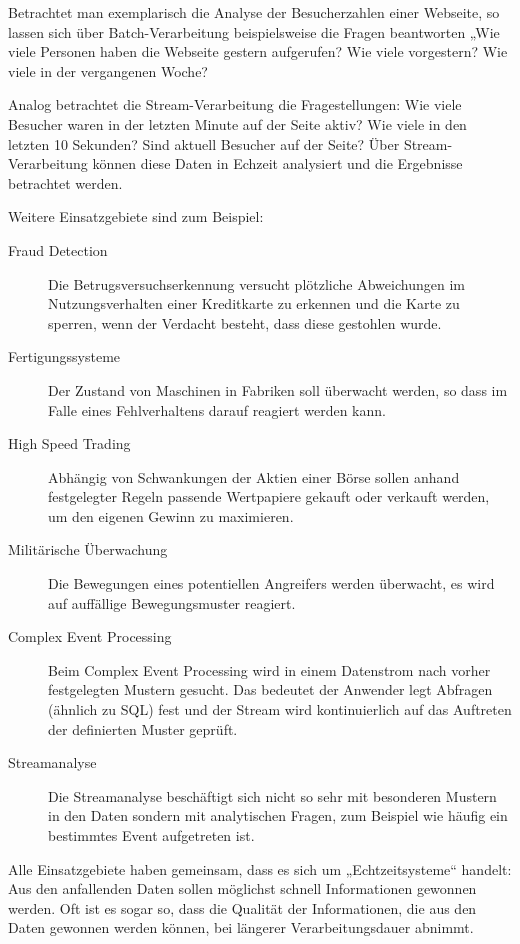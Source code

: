 \documentclass[a4paper,11pt]{scrartcl}
\begin{document}
  Betrachtet man exemplarisch die Analyse der Besucherzahlen einer Webseite, so
  lassen sich über Batch-Verarbeitung beispielsweise die Fragen beantworten „Wie
  viele Personen haben die Webseite gestern aufgerufen? Wie viele vorgestern?
  Wie viele in der vergangenen Woche?

  Analog betrachtet die Stream-Verarbeitung die Fragestellungen: Wie viele
  Besucher waren in der letzten Minute auf der Seite aktiv? Wie viele in den
  letzten 10 Sekunden? Sind aktuell Besucher auf der Seite? Über
  Stream-Verarbeitung können diese Daten in Echzeit analysiert und die Ergebnisse
  betrachtet werden.

  Weitere Einsatzgebiete sind zum Beispiel:\cite[S.~465ff.]{kleppmann17}
  \begin{description}
    \item[Fraud Detection] Die Betrugsversuchserkennung versucht plötzliche
      Abweichungen im Nutzungsverhalten einer Kreditkarte zu erkennen und die
      Karte zu sperren, wenn der Verdacht besteht, dass diese gestohlen wurde.
    \item[Fertigungssysteme] Der Zustand von Maschinen in Fabriken soll
      überwacht werden, so dass im Falle eines Fehlverhaltens darauf reagiert
      werden kann.
    \item[High Speed Trading] Abhängig von Schwankungen der Aktien einer Börse
      sollen anhand festgelegter Regeln passende Wertpapiere gekauft oder
      verkauft werden, um den eigenen Gewinn zu maximieren.
    \item[Militärische Überwachung] Die Bewegungen eines potentiellen
      Angreifers werden überwacht, es wird auf auffällige Bewegungsmuster
      reagiert.
    \item[Complex Event Processing] Beim Complex Event Processing wird in einem
      Datenstrom nach vorher festgelegten Mustern gesucht. Das bedeutet der
      Anwender legt Abfragen (ähnlich zu SQL) fest und der Stream wird
      kontinuierlich auf das Auftreten der definierten Muster geprüft.
    \item[Streamanalyse] Die Streamanalyse beschäftigt sich nicht so sehr mit
      besonderen Mustern in den Daten sondern mit analytischen Fragen, zum
      Beispiel wie häufig ein bestimmtes Event aufgetreten ist.
  \end{description}

  Alle Einsatzgebiete haben gemeinsam, dass es sich um „Echtzeitsysteme“ handelt:
  Aus den anfallenden Daten sollen möglichst schnell Informationen gewonnen
  werden. Oft ist es sogar so, dass die Qualität der Informationen, die aus den
  Daten gewonnen werden können, bei längerer Verarbeitungsdauer abnimmt.
\end{document}
